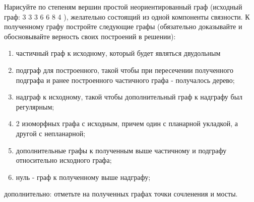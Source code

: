\question
Нарисуйте по степеням вершин простой неориентированный граф (исходный граф: 3 3 3 6 6 8 4  ), желательно состоящий из одной компоненты связности. 
К полученному графу постройте следующие графы (обязательно доказывайте и  обосновывайте верность своих построений в решении):
\begin{enumerate}
\item   частичный граф к исходному, который будет являться двудольным
\item   подграф для построенного, такой чтобы при пересечении полученного подграфа и ранее построенного частичного графа - получалось дерево;
\item   надграф к исходному, такой чтобы  дополнительный граф к надграфу был  регулярным;
\item   2 изоморфных графа с исходным, причем один с планарной укладкой, а другой с непланарной;
\item   дополнительные графы к полученным выше частичному и подграфу относительно исходного графа;
\item   нуль - граф к полученному выше надграфу;
\end{enumerate}
дополнительно: отметьте на полученных графах точки сочленения и мосты.



